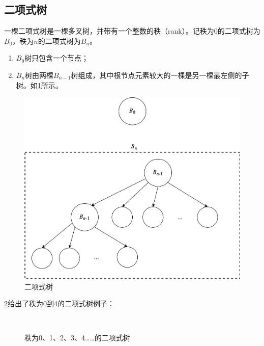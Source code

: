 \documentclass[b5paper]{ctexart}
\begin{document}
\subsection{二项式树}
\label{Binomial tree} 

一棵二项式树是一棵多叉树，并带有一个整数的秩（rank）。记秩为0的二项式树为$B_0$，秩为$n$的二项式树为$B_n$。

\begin{enumerate}
\item $B_0$树只包含一个节点；
\item $B_n$树由两棵$B_{n-1}$树组成，其中根节点元素较大的一棵是另一棵最左侧的子树。如\cref{fig:link-bitree}所示。
\end{enumerate}

\begin{figure}[htbp]
  \centering
  \includegraphics[scale=0.5]{img/btrees}
  \caption{二项式树}
  \label{fig:link-bitree}
\end{figure}

\cref{fig:bitree-forms}给出了秩为0到4的二项式树例子：

\begin{figure}[htbp]
  \centering
   \\
  \caption{秩为0、1、2、3、4……的二项式树}
  \label{fig:bitree-forms}
\end{figure}
\end{document}
